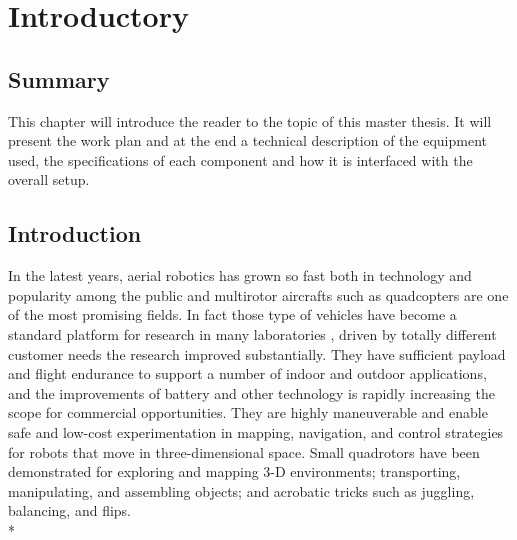 

\chapter{Introductory}
\label{chap:introductory}
\ifpdf
    \graphicspath{{Introduction/Figures/PNG/}{Introduction/Figures/PDF/}{Introduction/Figures/}}
\else
    \graphicspath{{Introduction/Figures/EPS/}{Introduction/Figures/}}
\fi

\section*{Summary}

This chapter will introduce  the reader to the topic of this master thesis. It will present the work plan and at the end a technical description of the equipment used, the specifications of each component and how it is interfaced with the overall setup.

\section{Introduction}

In the latest years, aerial robotics has grown so fast both in technology and popularity among the public and multirotor aircrafts such as quadcopters are one of the most promising fields. In fact those type of vehicles have become a standard platform for research in many laboratories , driven by totally different customer needs the research improved substantially. They have sufficient payload and flight endurance to support a number of indoor and outdoor applications, and the improvements of battery and other technology is rapidly increasing the scope for commercial opportunities. They are highly maneuverable and enable safe and low-cost experimentation in mapping, navigation, and control strategies for robots that move in three-dimensional space. Small quadrotors have been demonstrated for exploring and mapping 3-D environments; transporting, manipulating, and assembling objects; and acrobatic tricks such as juggling, balancing, and flips. \\*

